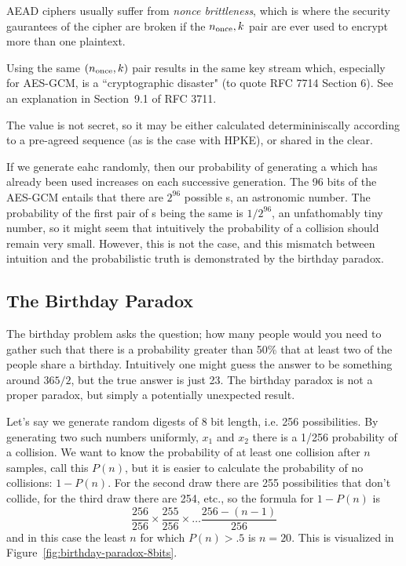 \ac{AEAD} ciphers usually suffer from {\em nonce brittleness},
which is where the security gaurantees of the cipher are broken if the $\nonce,k$ pair are ever used to encrypt more than one plaintext.

Using the same $(\nonce, k)$ pair results in the same key stream which, especially for AES-GCM, is a ``cryptographic disaster" (to quote RFC 7714 Section 6). See an explanation in Section~9.1 of RFC 3711.

The \nonce value is not secret, so it may be either calculated determininiscally according to a pre-agreed sequence (as is the case with \ac{HPKE}), or shared in the clear.

If we generate eahc \nonce randomly, then our probability of generating a \nonce which has already been used increases on each successive generation. The 96 bits of the AES-GCM \nonce entails that there are $2^96$ possible \nonce s, an astronomic number. The probability of the first pair of \nonce s being the same is $1/2^{96}$, an unfathomably tiny number, so it might seem that intuitively the probability of a \nonce collision should remain very small.
However, this is not the case, and this mismatch between intuition and the probabilistic truth is demonstrated by the birthday paradox.

\subsection{The Birthday Paradox}
The birthday problem asks the question; how many people would you need to gather such that there is a probability greater than 50\% that at least two of the people share a birthday. Intuitively one might guess the answer to be something around $365/2$, but the true answer is just 23. The birthday paradox is not a proper paradox, but simply a potentially unexpected result.

Let's say we generate random digests of 8 bit length, i.e. 256 possibilities. By generating two such numbers uniformly, $x_1$ and $x_2$ there is a 1/256 probability of a collision. We want to know the probability of at least one collision after $n$ samples, call this $P(n)$, but it is easier to calculate the probability of no collisions: $1-P(n)$.
For the second draw there are 255 possibilities that don't collide, for the third draw there are 254, etc., so the formula for $1-P(n)$ is \[\dfrac{256}{256}\times \dfrac{255}{256} \times \ldots \dfrac{256-(n-1)}{256}\] and in this case the least $n$ for which $P(n)>.5$ is $n=20$. This is visualized in Figure~\ref{fig:birthday-paradox-8bits}.

